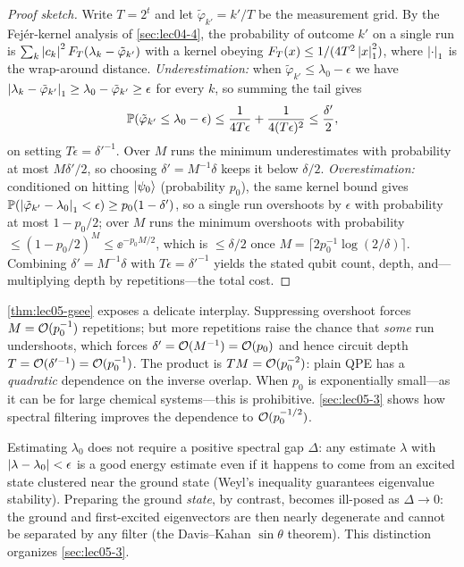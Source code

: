 \begin{proof}[Proof sketch]
Write $T=2^{t}$ and let $\tilde\varphi_{k'}=k'/T$ be the measurement grid. By the
Fej\'er-kernel analysis of \cref{sec:lec04-4}, the probability of outcome $k'$ on
a single run is $\sum_k\left\lvert c_k \right\rvert^2 F_T(\lambda_k-\tilde\varphi_{k'})$ with a
kernel obeying $F_T(x)\le 1/(4T^2\left\lvert x \right\rvert_1^2)$, where $\left\lvert \cdot \right\rvert_1$ is the
wrap-around distance. \emph{Underestimation:} when
$\tilde\varphi_{k'}\le\lambda_0-\epsilon$ we have
$\left\lvert \lambda_k-\tilde\varphi_{k'} \right\rvert_1\ge\lambda_0-\tilde\varphi_{k'}\ge\epsilon$
for every $k$, so summing the tail gives
\[
  \mathbb{P}(\tilde\varphi_{k'}\le\lambda_0-\epsilon)
  \le\frac{1}{4T\epsilon}+\frac{1}{4(T\epsilon)^{2}}\le\frac{\delta'}{2},
\]
on setting $T\epsilon=\delta'^{-1}$. Over $M$ runs the minimum underestimates with
probability at most $M\delta'/2$, so choosing $\delta'=M^{-1}\delta$ keeps it
below $\delta/2$. \emph{Overestimation:} conditioned on hitting $\ket{\psi_0}$
(probability $p_0$), the same kernel bound gives
$\mathbb{P}(\left\lvert \tilde\varphi_{k'}-\lambda_0 \right\rvert_1<\epsilon)\ge p_0(1-\delta')$, so a
single run overshoots by $\epsilon$ with probability at most $1-p_0/2$; over $M$
runs the minimum overshoots with probability
$\le(1-p_0/2)^M\le\ee^{-p_0 M/2}$, which is $\le\delta/2$ once
$M=\lceil 2p_0^{-1}\log(2/\delta)\rceil$. Combining $\delta'=M^{-1}\delta$ with
$T\epsilon=\delta'^{-1}$ yields the stated qubit count, depth, and---multiplying
depth by repetitions---the total cost.
\end{proof}

\begin{remark}
\label{rem:lec05-overlap}
\cref{thm:lec05-gsee} exposes a delicate interplay. Suppressing overshoot forces
$M=\mathcal{O}(p_0^{-1})$ repetitions; but more repetitions raise the chance that
\emph{some} run undershoots, which forces $\delta'=\mathcal{O}(M^{-1})=\mathcal{O}(p_0)$ and
hence circuit depth $T=\mathcal{O}(\delta'^{-1})=\mathcal{O}(p_0^{-1})$. The product is
$TM=\mathcal{O}(p_0^{-2})$: plain QPE has a \emph{quadratic} dependence on the inverse
overlap. When $p_0$ is exponentially small---as it can be for large chemical
systems---this is prohibitive. \cref{sec:lec05-3} shows how spectral filtering
improves the dependence to $\mathcal{O}(p_0^{-1/2})$.
\end{remark}

\begin{remark}
\label{rem:lec05-nogap}
Estimating $\lambda_0$ does not require a positive spectral gap $\Delta$: any
estimate $\lambda$ with $\left\lvert \lambda-\lambda_0 \right\rvert<\epsilon$ is a good energy
estimate even if it happens to come from an excited state clustered near the
ground state (Weyl's inequality guarantees eigenvalue stability). Preparing the
ground \emph{state}, by contrast, becomes ill-posed as $\Delta\to0$: the ground
and first-excited eigenvectors are then nearly degenerate and cannot be separated
by any filter (the Davis--Kahan $\sin\theta$ theorem). This distinction organizes
\cref{sec:lec05-3}.
\end{remark}

